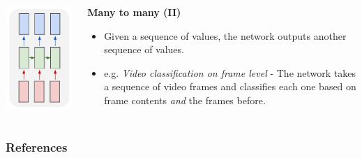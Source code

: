 \documentclass{beamer}
\begin{document}
\begin{frame}[allowframebreaks]
\begin{columns}
\begin{column}{0.5\textwidth}
\begin{itemize}
      \end{itemize}
    \end{column}
  \end{columns}
  \framebreak
  \begin{columns}
    \begin{column}{0.3\textwidth}
      \includegraphics[height=0.7\textheight]{../img/rnn-many-to-many-2.png}
    \end{column}
    \begin{column}{0.7\textwidth}
      \begin{center}
        \textbf{Many to many (II)}
      \end{center}
      \begin{itemize}
        \item Given a sequence of values, the network outputs another sequence of values.
        \item e.g. \textit{Video classification on frame level} - The network takes a sequence of video frames and classifies each one based on frame contents \textit{and} the frames before.
      \end{itemize}
    \end{column}
  \end{columns}
\end{frame}
\begin{frame}[allowframebreaks]
  \frametitle{References}
  
  
\end{frame}
\end{document}
